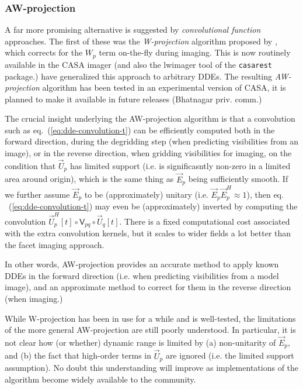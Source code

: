 \documentclass[]{aa}
\newcommand{\herm}{H}
\newcommand{\jones}[2]{\vec {#1}_{#2}}
\newcommand{\jonesT}[2]{\vec {#1}^{\herm}_{#2}}
\newcommand{\coh}[2]{\mathsf{{#1}}_{{#2}}}
\begin{document}
\subsubsection{AW-projection}

A far more promising alternative is suggested by \emph{convolutional function} approaches. The first of these was the \emph{W-projection} algorithm proposed by \citet{Cornwell:wproj}, which corrects for the $W_p$ term on-the-fly during imaging. This is now routinely available in the CASA imager (and also the {\sf lwimager} tool of the {\tt casarest} package.) \citet{SB:imageplane} have generalized this approach to arbitrary DDEs. The resulting \emph{AW-projection} algorithm has been tested in an experimental version of CASA, it is planned to make it available in future releases (Bhatnagar priv. comm.)

The crucial insight underlying the AW-projection algorithm is that a convolution such as eq.~(\ref{eq:dde-convolution-t}) can be efficiently computed both in the forward direction, during the degridding step (when predicting visibilities from an image), or in the reverse direction, when gridding visibilities for imaging, on the condition that $\jones{U}{p}$ has limited support (i.e. is significasntly non-zero in a limited area around origin), which is the same thing as $\jones{E}{p}$ being sufficiently smooth. If we further assume $\jones{E}{p}$ to be (approximately) unitary (i.e. 
$\jones{E}{p}\jonesT{E}{p}\approx1$), then eq. ~(\ref{eq:dde-convolution-t}) may even be (approximately) inverted by computing the convolution $\jonesT{U}{p}[t] \circ \coh{V}{pq} \circ \jones{U}{q}[t]$. There is a fixed computational cost associated with the extra convolution kernels, but it scales to wider fields a lot better than the facet imaging approach.

In other words, AW-projection provides an accurate method to apply known DDEs in the forward direction (i.e. when predicting visibilities from a model image), and an approximate method to correct for them in the reverse direction (when imaging.)

While W-projection has been in use for a while and is well-tested, the limitations of the more general AW-projection are still poorly understood. In particular, it is not clear how (or whether) dynamic range is limited by (a) non-unitarity of $\jones{E}{p}$, and (b) the fact that high-order terms in $\jones{U}{p}$ are ignored (i.e. the limited support assumption). No doubt this understanding will improve as implementations of the algorithm become widely available to the community.
\end{document}
